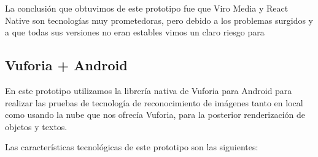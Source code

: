 La conclusión que obtuvimos de este prototipo fue que Viro Media y React Native son tecnologías muy prometedoras, pero debido a los
 problemas surgidos y a que todas sus versiones no eran estables vimos un claro riesgo para

\subsection{Vuforia + Android} 
\label{makereference4.1.3} 
 
En este prototipo utilizamos la librería nativa de Vuforia para Android para 
realizar las pruebas de tecnología de reconocimiento de imágenes tanto en  
local como usando la nube que nos ofrecía Vuforia, para la posterior renderización
de objetos y textos.

Las características tecnológicas de este prototipo son las siguientes:


